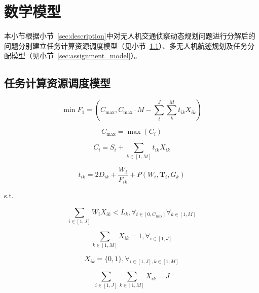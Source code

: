 \section{数学模型} \label{sec:math_model}

本小节根据小节~\ref{sec:description}中对无人机交通侦察动态规划问题进行分解后的问题分别建立任务计算资源调度模型（见小节~\ref{sec:resouce_scheduling_model}）、多无人机航迹规划及任务分配模型（见小节~\ref{sec:assignment_model}）。

\subsection{任务计算资源调度模型} \label{sec:resouce_scheduling_model}

\begin{equation}
    \min F_1 = (C_{\text{max}}, C_{\text{max}} \cdot M - \sum^J_{i} \sum^M_{k} t_{ik} X_{i k})  \label{eq:target1}
\end{equation}

\begin{equation}
    C_{\text{max}} = \max(C_{i}) \label{eq:target_mean1}
\end{equation}

\begin{equation}
    C_{i} = S_{i} + \sum_{k \in [1, M]} t_{ik} X_{ik} \label{eq:completion_time3}
\end{equation}

\begin{equation}
    t_{ik} = 2 D_{ik} + \frac{W_i}{F_{ik}} + P(W_i, \mathbf{T}_i, G_k) \label{eq:compute_time3}
\end{equation}

s.t.

\begin{equation}
    \sum_{i \in [1, J]} W_i X_{ik} < L_k, \forall_{t \in [0, C_{\text{max}}]} \forall_{k \in [1, M]} \label{eq:mem_restrant3}
\end{equation}

\begin{equation}
    \sum_{k \in [1, M]} X_{ik} = 1, \forall_{i \in [1, J]} \label{eq:only_one3}
\end{equation}

\begin{equation}
    X_{ik} = \{0, 1\}, \forall_{i \in [1, J], k \in [1, M]} \label{eq:integer_restrant3}
\end{equation}

\begin{equation}
    \sum_{i \in [1,  J]} \sum_{k \in [1, M]} X_{i k} = J \label{eq:all_mission3}
\end{equation}

